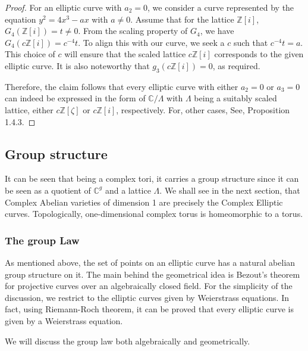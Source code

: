 \begin{proposition}
\begin{proof}
For an elliptic curve with \( a_2 = 0 \), we consider a curve represented by the equation \( y^2 = 4x^3 - ax \) with \( a \neq 0 \). Assume that for the lattice \( \mathbb{Z}[i] \), \( G_4(\mathbb{Z}[i]) = t \neq 0 \). From the scaling property of \( G_4 \), we have \( G_4(c\mathbb{Z}[i]) = c^{-4}t \). To align this with our curve, we seek a \( c \) such that \( c^{-4}t = a \). This choice of \( c \) will ensure that the scaled lattice \( c\mathbb{Z}[i] \) corresponds to the given elliptic curve. It is also noteworthy that \( g_3(c\mathbb{Z}[i]) = 0 \), as required.

Therefore, the claim follows that every elliptic curve with either \( a_2 = 0 \) or \( a_3 = 0 \) can indeed be expressed in the form of \( \mathbb{C} / \Lambda \) with \( \Lambda \) being a suitably scaled lattice, either \( c \mathbb{Z}[\zeta]\) or \( c \mathbb{Z}[i] \), respectively.
For, other cases, See, \cite{diamond2005first} Proposition 1.4.3.
\end{proof}
\end{proposition}


\subsection{Group structure}
It can be seen that being a complex tori, it carries a group structure since it can be seen as a quotient of $\mathbb{C}^g$ and a lattice $\Lambda$. We shall see in the next section, that Complex Abelian varieties of dimension 1 are precisely the Complex Elliptic curves. Topologically, one-dimensional complex torus is homeomorphic to a torus. \\
    
\subsubsection*{The group Law}
As mentioned above, the set of points on an elliptic curve has a natural abelian group structure on it. The main behind the geometrical idea is Bezout's theorem for projective curves over an algebraically closed field. For the simplicity of the discussion, we restrict to the elliptic curves given by Weierstrass equations. In fact, using Riemann-Roch theorem, it can be proved that every elliptic curve is given by a Weierstrass equation. 
\bigskip

We will discuss the group law both algebraically and geometrically.

